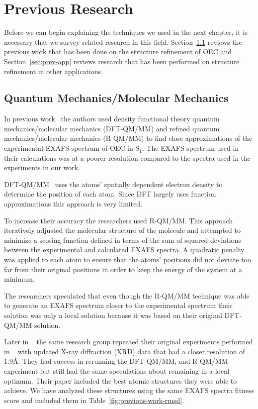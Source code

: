 \chapter{Previous Research}

Before we can begin explaining the techniques we used in the next chapter, it is necessary that we survey related research in this field. Section~\ref{sec:prev-work} reviews the previous work that has been done on the structure refinement of OEC and Section~\ref{sec:prev-app} reviews research that has been performed on structure refinement in other applications.

\section{Quantum Mechanics/Molecular Mechanics}
\label{sec:prev-work}

In previous work~\cite{sproviero2008model} the authors used density functional theory quantum mechanics/molecular mechanics (DFT-QM/MM) and refined quantum mechanics/molecular mechanics (R-QM/MM) to find close approximations of the experimental EXAFS spectrum of OEC in S$_{1}$. The EXAFS spectrum used in their calculations was at a poorer resolution compared to the spectra used in the experiments in our work.

DFT-QM/MM~\cite{parr1989density} uses the atoms' spatially dependent electron density to determine the position of each atom. Since DFT largely uses function approximations this approach is very limited.

To increase their accuracy the researchers used R-QM/MM. This approach iteratively adjusted the molecular structure of the molecule and attempted to minimize a scoring function defined in terms of the sum of squared deviations between the experimental and calculated EXAFS spectra. A quadratic penalty was applied to each atom to ensure that the atoms' positions did not deviate too far from their original positions in order to keep the energy of the system at a minimum.

The researchers speculated that even though the R-QM/MM technique was able to generate an EXAFS spectrum closer to the experimental spectrum their solution was only a local solution because it was based on their original DFT-QM/MM solution.

Later in ~\cite{luber2011s1} the same research group repeated their original experiments performed in ~\cite{sproviero2008model} with updated X-ray diffraction (XRD) data that had a closer resolution of 1.9\AA. They had success in rerunning the DFT-QM/MM, and R-QM/MM experiment but still had the same speculations about remaining in a local optimum. Their paper included the best atomic structures they were able to achieve. We have analyzed these structures using the same EXAFS spectra fitness score and included them in Table~\ref{fig:previous-work-rmsd}.

